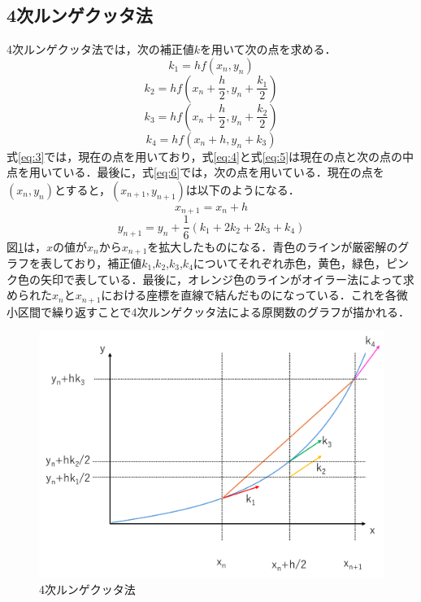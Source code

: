 \documentclass[a4paper, 12pt]{ltjsarticle}
\begin{document}
\subsection{4次ルンゲクッタ法}
4次ルンゲクッタ法では，次の補正値$k$を用いて次の点を求める．
\begin{equation}
  k_1=hf(x_n,y_n)\label{eq:3}
\end{equation}
\begin{equation}
  k_2=hf(x_n+\frac{h}{2},y_n+\frac{k_1}{2})\label{eq:4}
\end{equation}
\begin{equation}
  k_3=hf(x_n+\frac{h}{2},y_n+\frac{k_2}{2})\label{eq:5}
\end{equation}
\begin{equation}
  k_4=hf(x_n+h,y_n+k_3)\label{eq:6}
\end{equation}
式\eqref{eq:3}では，現在の点を用いており，式\eqref{eq:4}と式\eqref{eq:5}は現在の点と次の点の中点を用いている．最後に，式\eqref{eq:6}では，次の点を用いている．現在の点を$(x_n,y_n)$とすると，$(x_{n+1},y_{n+1})$は以下のようになる．
\begin{equation}
  x_{n+1}=x_n+h\label{eq:7}
\end{equation}
\begin{equation}
  y_{n+1}=y_n+\frac{1}{6}(k_1+2k_2+2k_3+k_4)\label{eq:8}
\end{equation}
\clearpage
図\ref{fig:4次ルンゲクッタ法}は，$x$の値が$x_n$から$x_{n+1}$を拡大したものになる．青色のラインが厳密解のグラフを表しており，補正値$k_1$,$k_2$,$k_3$,$k_4$についてそれぞれ赤色，黄色，緑色，ピンク色の矢印で表している．最後に，オレンジ色のラインがオイラー法によって求められた$x_n$と$x_{n+1}$における座標を直線で結んだものになっている．これを各微小区間で繰り返すことで4次ルンゲクッタ法による原関数のグラフが描かれる．
\begin{figure}[h]
\begin{center}
\includegraphics[clip,width=\textwidth,keepaspectratio]{runge-kutta.pdf}
\end{center}
\caption{4次ルンゲクッタ法}
\label{fig:4次ルンゲクッタ法}
\end{figure}
\clearpage
\end{document}
